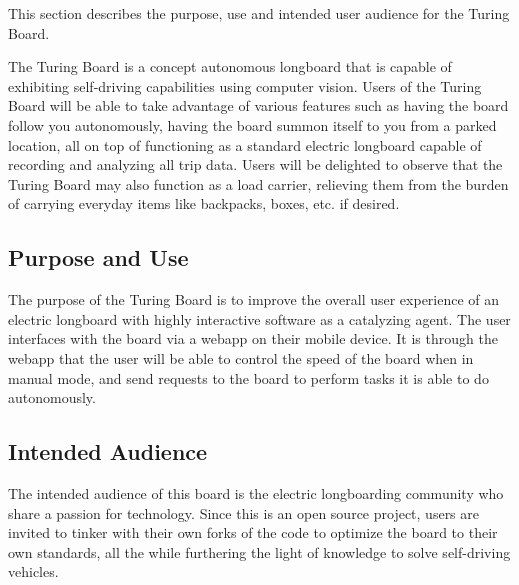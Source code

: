 This section describes the purpose, use and intended user audience for the Turing Board. 

The Turing Board is a concept autonomous longboard that is capable of exhibiting self-driving capabilities using computer vision. Users of the Turing Board will be able to take advantage of various features such as having the board follow you autonomously, having the board summon itself to you from a parked location, all on top of functioning as a standard electric longboard capable of recording and analyzing all trip data. Users will be delighted to observe that the Turing Board may also function as a load carrier, relieving them from the burden of carrying everyday items like backpacks, boxes, etc. if desired. 

\subsection{Purpose and Use}
The purpose of the Turing Board is to improve the overall user experience of an electric longboard with highly interactive software as a catalyzing agent. The user interfaces with the board via a webapp on their mobile device. It is through the webapp that the user will be able to control the speed of the board when in manual mode, and send requests to the board to perform tasks it is able to do autonomously. 

\subsection{Intended Audience}
The intended audience of this board is the electric longboarding community who share a passion for technology. Since this is an open source project, users are invited to tinker with their own forks of the code to optimize the board to their own standards, all the while furthering the light of knowledge to solve self-driving vehicles. 
